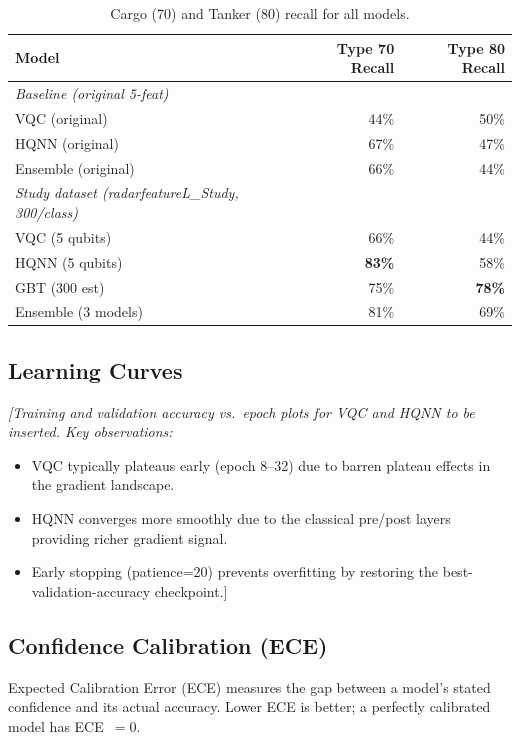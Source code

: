 \documentclass[journal]{IEEEtran}
\begin{document}
\begin{table}[H]
\centering
\caption{Cargo (70) and Tanker (80) recall for all models.}
\begin{tabular}{lrr}
\toprule
\textbf{Model} & \textbf{Type 70 Recall} & \textbf{Type 80 Recall} \\
\midrule
\textit{Baseline (original 5-feat)} & & \\
VQC (original)    & 44\% & 50\% \\
HQNN (original)   & 67\% & 47\% \\
Ensemble (original) & 66\% & 44\% \\
\midrule
\textit{Study dataset (radarfeatureL\_Study, 300/class)} & & \\
VQC  (5 qubits)   & 66\% & 44\% \\
HQNN (5 qubits)   & \textbf{83\%} & 58\% \\
GBT  (300 est)    & 75\% & \textbf{78\%} \\
Ensemble (3 models) & 81\% & 69\% \\
\bottomrule
\end{tabular}
\end{table}

\subsection{Learning Curves}

\textit{[Training and validation accuracy vs.\ epoch plots for VQC and HQNN
to be inserted. Key observations:}
\begin{itemize}
  \item VQC typically plateaus early (epoch 8--32) due to barren plateau effects
        in the gradient landscape.
  \item HQNN converges more smoothly due to the classical pre/post layers
        providing richer gradient signal.
  \item Early stopping (patience=20) prevents overfitting by restoring the
        best-validation-accuracy checkpoint.]
\end{itemize}

\subsection{Confidence Calibration (ECE)}

Expected Calibration Error (ECE) measures the gap between a model's
stated confidence and its actual accuracy. Lower ECE is better; a
perfectly calibrated model has ECE~$= 0$.
\end{document}
